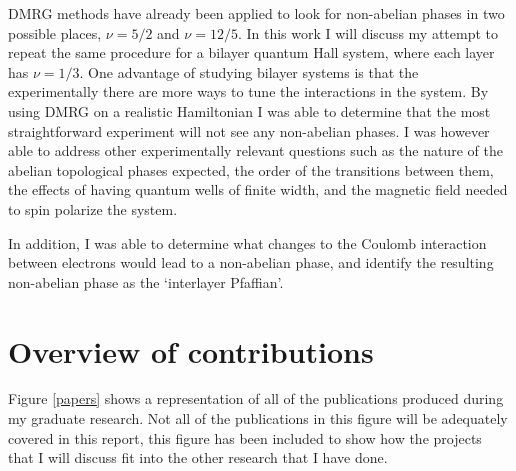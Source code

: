DMRG methods have already been applied to look for non-abelian phases in two possible places, $\nu=5/2$ and $\nu=12/5$. In this work I will discuss my attempt to repeat the same procedure for a bilayer quantum Hall system, where each layer has $\nu=1/3$. One advantage of studying bilayer systems is that the experimentally there are more ways to tune the interactions in the system. By using DMRG on a realistic Hamiltonian I was able to determine that the most straightforward experiment will not see any non-abelian phases. I was however able to address other experimentally relevant questions such as the nature of the abelian topological phases expected, the order of the transitions between them, the effects of having quantum wells of finite width, and the magnetic field needed to spin polarize the system.

In addition, I was able to determine what changes to the Coulomb interaction between electrons would lead to a non-abelian phase, and identify the resulting non-abelian phase as the `interlayer Pfaffian'.

\section{Overview of contributions}

Figure \ref{papers} shows a representation of all of the publications produced during my graduate research. Not all of the publications in this figure will be adequately covered in this report, this figure has been included to show how the projects that I will discuss fit into the other research that I have done. 

